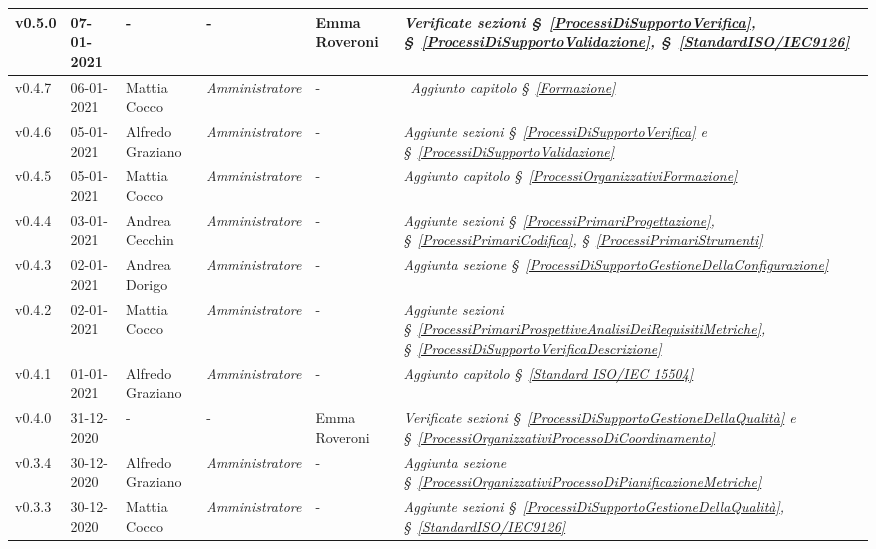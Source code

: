 {\begin{center}
\begin{longtable}[c]{|p{2cm-1\tabcolsep}|p{2cm}|p{3cm-2\tabcolsep}|p{3cm-1.5\tabcolsep}|p{}|p{4cm-2\tabcolsep}|}
		\hline
		\centering v0.5.0 & 07-01-2021 & \centering - & \centering - & Emma Roveroni & \textit{Verificate sezioni \S~\ref{ProcessiDiSupportoVerifica}, \S~\ref{ProcessiDiSupportoValidazione}, \S~\ref{StandardISO/IEC9126}}  \\
		\hline
		\centering v0.4.7 & 06-01-2021 & Mattia Cocco & \centering \textit{Amministratore} & \centering - & \	\textit{Aggiunto capitolo \S~\ref{Formazione}} \\
		\hline
		\centering v0.4.6 & 05-01-2021 & Alfredo Graziano & \centering \textit{Amministratore} & \centering - & \textit{Aggiunte sezioni \S~\ref{ProcessiDiSupportoVerifica} e \S~\ref{ProcessiDiSupportoValidazione} } \\
		\hline
		\centering v0.4.5 & 05-01-2021 & Mattia Cocco & \centering \textit{Amministratore} & \centering - & \textit{Aggiunto capitolo \S~\ref{ProcessiOrganizzativiFormazione}} \\
		\hline
		\centering v0.4.4 & 03-01-2021 & Andrea Cecchin & \centering \textit{Amministratore} & \centering - & \textit{Aggiunte sezioni \S~\ref{ProcessiPrimariProgettazione}, \S~\ref{ProcessiPrimariCodifica}, \S~\ref{ProcessiPrimariStrumenti}} \\
		\hline
		\centering v0.4.3 & 02-01-2021 & Andrea Dorigo & \centering \textit{Amministratore} & \centering - & \textit{Aggiunta sezione \S~\ref{ProcessiDiSupportoGestioneDellaConfigurazione}} \\
		\hline
		\centering v0.4.2 & 02-01-2021 & Mattia Cocco & \centering \textit{Amministratore} & \centering - & \textit{Aggiunte sezioni \S~\ref{ProcessiPrimariProspettiveAnalisiDeiRequisitiMetriche}, \S~\ref{ProcessiDiSupportoVerificaDescrizione}} \\
		\hline
		\centering v0.4.1 & 01-01-2021 & Alfredo Graziano & \centering \textit{Amministratore} & \centering - & \textit{Aggiunto capitolo \S~\ref{Standard ISO/IEC 15504}} \\
		\hline
		\centering v0.4.0 & 31-12-2020 & \centering - & \centering - & Emma Roveroni & \textit{Verificate sezioni \S~\ref{ProcessiDiSupportoGestioneDellaQualità} e \S~\ref{ProcessiOrganizzativiProcessoDiCoordinamento} }  \\
		\hline
		\centering v0.3.4 & 30-12-2020 & Alfredo Graziano & \centering \textit{Amministratore} & \centering - & \textit{Aggiunta sezione \S~\ref{ProcessiOrganizzativiProcessoDiPianificazioneMetriche}} \\
		\hline
		\centering v0.3.3 & 30-12-2020 & Mattia Cocco & \centering \textit{Amministratore} & \centering - & \textit{Aggiunte sezioni \S~\ref{ProcessiDiSupportoGestioneDellaQualità}, \S~\ref{StandardISO/IEC9126} } \\

\end{longtable}
\end{center}}
